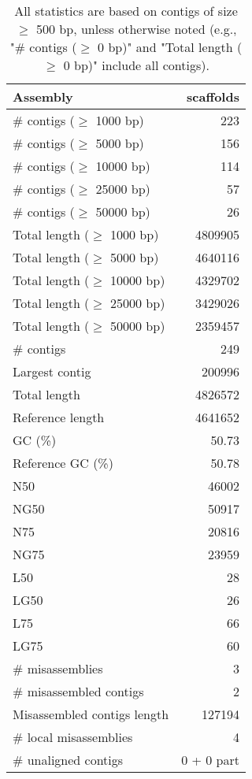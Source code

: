 \documentclass[12pt,a4paper]{article}
\begin{document}
\begin{table}[ht]
\begin{center}
\caption{All statistics are based on contigs of size $\geq$ 500 bp, unless otherwise noted (e.g., "\# contigs ($\geq$ 0 bp)" and "Total length ($\geq$ 0 bp)" include all contigs).}
\begin{tabular}{|l*{1}{|r}|}
\hline
Assembly & scaffolds \\ \hline
\# contigs ($\geq$ 1000 bp) & 223 \\ \hline
\# contigs ($\geq$ 5000 bp) & 156 \\ \hline
\# contigs ($\geq$ 10000 bp) & 114 \\ \hline
\# contigs ($\geq$ 25000 bp) & 57 \\ \hline
\# contigs ($\geq$ 50000 bp) & 26 \\ \hline
Total length ($\geq$ 1000 bp) & 4809905 \\ \hline
Total length ($\geq$ 5000 bp) & 4640116 \\ \hline
Total length ($\geq$ 10000 bp) & 4329702 \\ \hline
Total length ($\geq$ 25000 bp) & 3429026 \\ \hline
Total length ($\geq$ 50000 bp) & 2359457 \\ \hline
\# contigs & 249 \\ \hline
Largest contig & 200996 \\ \hline
Total length & 4826572 \\ \hline
Reference length & 4641652 \\ \hline
GC (\%) & 50.73 \\ \hline
Reference GC (\%) & 50.78 \\ \hline
N50 & 46002 \\ \hline
NG50 & 50917 \\ \hline
N75 & 20816 \\ \hline
NG75 & 23959 \\ \hline
L50 & 28 \\ \hline
LG50 & 26 \\ \hline
L75 & 66 \\ \hline
LG75 & 60 \\ \hline
\# misassemblies & 3 \\ \hline
\# misassembled contigs & 2 \\ \hline
Misassembled contigs length & 127194 \\ \hline
\# local misassemblies & 4 \\ \hline
\# unaligned contigs & 0 + 0 part \\ \hline

\end{tabular}
\end{center}
\end{table}
\end{document}

